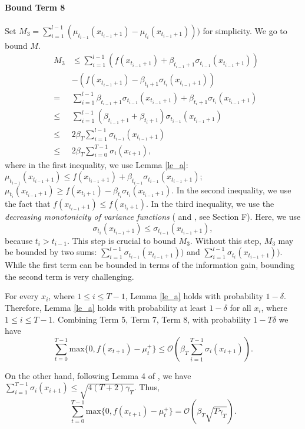 \documentclass[twoside]{article}
\newenvironment{proof*}[1][\proofname]{
  \renewcommand\qedsymbol{\rule{2.5mm}{2.5mm}}
  \begin{proof}[#1]}{\end{proof}}
\begin{document}
\begin{proof*}
\paragraph{Bound Term 8}
Set $M_3 = \sum_{i=1}^{l-1} (\mu_{t_{i-1}}(x_{t_{i-1} +1}) - \mu_{t_i}(x_{t_{i-1} +1})))$ for simplicity. We go to bound $M$.
\begin{eqnarray*}
& M_3 &  \le   \sum_{i=1}^{l-1} (f(x_{t_{i-1} +1}) + \beta_{t_{i-1}+1}\sigma_{t_{i-1}}(x_{t_{i-1} +1}))  \\
&  & - (f(x_{t_{i-1} +1})- \beta_{t_{i}+1}\sigma_{t_{i}}(x_{t_{i-1} +1})) \\
& = & \sum_{i=1}^{l-1} \beta_{t_{i-1}+1}\sigma_{t_{i-1}}(x_{t_{i-1} +1}) + \beta_{t_{i}+1}\sigma_{t_{i}}(x_{t_{i-1} +1}) \\
& \le & \sum_{i=1}^{l-1}(\beta_{t_{i-1}+1} + \beta_{t_{i}+1})\sigma_{t_{i-1}}(x_{t_{i-1} +1})\\
& \le & 2\beta_T \sum_{i=1}^{l-1}\sigma_{t_{i-1}}(x_{t_{i-1} +1})\\
& \le & 2\beta_T \sum_{i=0}^{T-1} \sigma_{i}(x_{i+1}),
\end{eqnarray*}
where in the first inequality, we use Lemma \ref{le_a}: $\mu_{t_{i-1}}(x_{t_{i-1} +1}) \le f(x_{t_{i-1} +1}) + \beta_{t_{i-1}}\sigma_{t_{i-1}}(x_{t_{i-1} +1})$; $\mu_{t_i}(x_{t_{i-1} +1}) \ge f(x_{t_{i} +1}) - \beta_{t_{i}}\sigma_{t_{i}}(x_{t_{i-1} +1})$. In the second inequality, we use the fact that $f(x_{t_{i-1} +1}) \le f(x_{t_{i} +1})$. In the third inequality, we use the \emph{decreasing monotonicity of variance functions} (\citep{vivarelli} and \citep{Chowdhury17}, see Section F). Here, we use $$\sigma_{t_{i}}(x_{t_{i-1} +1}) \le \sigma_{t_{i-1}}(x_{t_{i-1} +1}),$$ because $t_i > t_{i-1}$.
This step is crucial to bound $M_3$. Without this step, $M_3$ may be bounded by two sums:  $\sum^{l-1}_{i=1}  \sigma_{t_{i-1}}(x_{t_{i-1} +1}))$ and $ \sum^{l-1}_{i=1} \sigma_{t_{i}}(x_{t_{i-1} +1}))$. While the first term can be bounded in terms of the information gain, bounding the second  term is very challenging.

For every $x_i$, where $ 1 \le i \le T-1$, Lemma \ref{le_a} holds with probability $1 -\delta$. Therefore, Lemma \ref{le_a} holds with probability at least $1 -\delta$ for all $x_i$, where $ 1 \le i \le T-1$.
Combining Term 5, Term 7, Term 8, with probability $1 -T\delta$ we have
$$\sum_{t=0}^{T-1} \text{max}\{0, f(x_{t+1}) - \mu_t^+\} \le  \mathcal O(\beta_T \sum_{i=1}^{T-1} \sigma_{i}(x_{i+1})).$$

On the other hand, following Lemma 4 of \cite{Chowdhury17}, we have $\sum_{i=1}^{T-1} \sigma_{i}(x_{i+1}) \le  \sqrt{4(T+2)\gamma_T}$.  Thus,
$$\sum_{t=0}^{T-1} \text{max}\{0, f(x_{t+1}) - \mu_t^+\} = \mathcal O(\beta_T \sqrt{T\gamma_T}).$$
\end{proof*}
\end{document}
